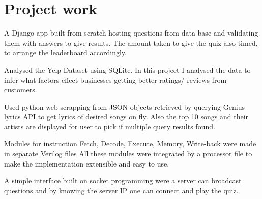 \documentclass[]{karthik_sama}
\begin{document}
\begin{minipage}[t]{0.66\textwidth}
\section{Project work}
\noindent{\color{hr}\rule{12.5cm}{0.4pt}}
\noindent
A Django app built from scratch hosting questions from data base and validating them with answers to give results. The amount taken to give the quiz also timed, to arrange the leaderboard accordingly.\\ 
\vspace{0.6em}

Analysed the Yelp Dataset using SQLite. In this project I analysed the data to infer what factors effect businesses getting better ratings/ reviews from customers. 
\vspace{0.6em}

Used python web scrapping from JSON objects retrieved by querying Genius lyrics API to get lyrics of desired songs on fly. Also the top 10 songs and their artists are displayed for user to pick if multiple query results found.
\vspace{0.6em}

Modules for instruction Fetch, Decode, Execute, Memory, Write-back were made in separate Verilog files All these modules were integrated by a processor file to make the implementation extensible and easy to use.
\vspace{0.6em}

A simple interface built on socket programming were a server can broadcast questions and by knowing the server IP one can connect and play the quiz.

\end{minipage} 
\end{document}
